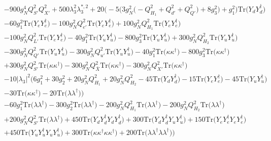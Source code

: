{\begin{align}
 &-900 g_{N}^{4} Q_{S'}^{2} Q_{X'}^{2} +500 \lambda_{3}^{2} \lambda_{3}^{*,2} +20 \Big(-5 \Big(3 g_{N}^{2} \Big(- Q_{H_1}^{2}  + Q_{d'}^{2} + Q_{Q'}^{2}\Big) + 8 g_{3}^{2} \Big) + g_{1}^{2}\Big)\mbox{Tr}\Big({Y_d  Y_{d}^{\dagger}}\Big) \nonumber \\ 
 &-60 g_{1}^{2} \mbox{Tr}\Big({Y_e  Y_{e}^{\dagger}}\Big) -100 g_{N}^{2} Q_{e'}^{2} \mbox{Tr}\Big({Y_e  Y_{e}^{\dagger}}\Big) +100 g_{N}^{2} Q_{H_1}^{2} \mbox{Tr}\Big({Y_e  Y_{e}^{\dagger}}\Big) \nonumber \\ 
 &-100 g_{N}^{2} Q_{L'}^{2} \mbox{Tr}\Big({Y_e  Y_{e}^{\dagger}}\Big) -40 g_{1}^{2} \mbox{Tr}\Big({Y_u  Y_{u}^{\dagger}}\Big) -800 g_{3}^{2} \mbox{Tr}\Big({Y_u  Y_{u}^{\dagger}}\Big) +300 g_{N}^{2} Q_{H_2}^{2} \mbox{Tr}\Big({Y_u  Y_{u}^{\dagger}}\Big) \nonumber \\ 
 &-300 g_{N}^{2} Q_{Q'}^{2} \mbox{Tr}\Big({Y_u  Y_{u}^{\dagger}}\Big) -300 g_{N}^{2} Q_{u'}^{2} \mbox{Tr}\Big({Y_u  Y_{u}^{\dagger}}\Big) -40 g_{1}^{2} \mbox{Tr}\Big({\kappa  \kappa^{\dagger}}\Big) -800 g_{3}^{2} \mbox{Tr}\Big({\kappa  \kappa^{\dagger}}\Big) \nonumber \\ 
 &+300 g_{N}^{2} Q_{S'}^{2} \mbox{Tr}\Big({\kappa  \kappa^{\dagger}}\Big) -300 g_{N}^{2} Q_{\bar{X}}^{2} \mbox{Tr}\Big({\kappa  \kappa^{\dagger}}\Big) -300 g_{N}^{2} Q_{X'}^{2} \mbox{Tr}\Big({\kappa  \kappa^{\dagger}}\Big) \nonumber \\ 
 &-10 |\lambda_3|^2 \Big(6 g_{1}^{2} +30 g_{2}^{2} +20 g_{N}^{2} Q_{H_1}^{2} +20 g_{N}^{2} Q_{H_2}^{2} -45 \mbox{Tr}\Big({Y_d  Y_{d}^{\dagger}}\Big) -15 \mbox{Tr}\Big({Y_e  Y_{e}^{\dagger}}\Big) -45 \mbox{Tr}\Big({Y_u  Y_{u}^{\dagger}}\Big) \nonumber \\ 
 &-30 \mbox{Tr}\Big({\kappa  \kappa^{\dagger}}\Big) -20 \mbox{Tr}\Big({\lambda  \lambda^{\dagger}}\Big) \Big)\nonumber \\ 
 &-60 g_{1}^{2} \mbox{Tr}\Big({\lambda  \lambda^{\dagger}}\Big) -300 g_{2}^{2} \mbox{Tr}\Big({\lambda  \lambda^{\dagger}}\Big) -200 g_{N}^{2} Q_{H_1}^{2} \mbox{Tr}\Big({\lambda  \lambda^{\dagger}}\Big) -200 g_{N}^{2} Q_{H_2}^{2} \mbox{Tr}\Big({\lambda  \lambda^{\dagger}}\Big) \nonumber \\ 
 &+200 g_{N}^{2} Q_{S'}^{2} \mbox{Tr}\Big({\lambda  \lambda^{\dagger}}\Big) +450 \mbox{Tr}\Big({Y_d  Y_{d}^{\dagger}  Y_d  Y_{d}^{\dagger}}\Big) +300 \mbox{Tr}\Big({Y_d  Y_{d}^{\dagger}  Y_u  Y_{u}^{\dagger}}\Big) +150 \mbox{Tr}\Big({Y_e  Y_{e}^{\dagger}  Y_e  Y_{e}^{\dagger}}\Big) \nonumber \\ 
 &+450 \mbox{Tr}\Big({Y_u  Y_{u}^{\dagger}  Y_u  Y_{u}^{\dagger}}\Big) +300 \mbox{Tr}\Big({\kappa  \kappa^{\dagger}  \kappa  \kappa^{\dagger}}\Big) +200 \mbox{Tr}\Big({\lambda  \lambda^{\dagger}  \lambda  \lambda^{\dagger}}\Big) \Big)\\ 

\end{align}}
